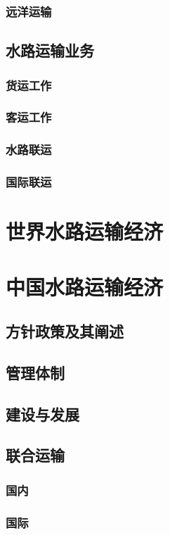 \documentclass[UTF8]{../../RepresentationUniverse}
\begin{document}
        \subsubsection{远洋运输}
    \subsection{水路运输业务}
        \subsubsection{货运工作}
        \subsubsection{客运工作}
        \subsubsection{水路联运}
        \subsubsection{国际联运}

\section{世界水路运输经济}

\section{中国水路运输经济}
    \subsection{方针政策及其阐述}
    \subsection{管理体制}
    \subsection{建设与发展}
    \subsection{联合运输}
        \subsubsection{国内}
        \subsubsection{国际}
\end{document}
